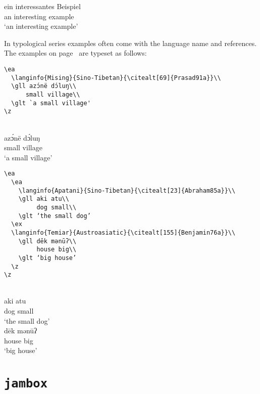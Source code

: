 \ea
\def\exfont{\normalsize\itshape}
\gll ein {\ob}interessantes       Beispiel{\cb}\\
     an  {\db}interesting example\\
\glt `an interesting example'
\z 
 


In typological series examples often come with the language name and references. The examples on
page~\pageref{ex-typology} are typeset as follows:
\begin{verbatim}
\ea
  \langinfo{Mising}{Sino-Tibetan}{\citealt[69]{Prasad91a}}\\
  \gll azɔ́në dɔ́luŋ\\
      small village\\ 
  \glt `a small village' 
\z
\end{verbatim}
\ea
  \\
  \gll azɔ́në dɔ́luŋ\\
      small village\\ 
  \glt `a small village' 
\z

\newpage

\begin{verbatim}
\ea 
  \ea
    \langinfo{Apatani}{Sino-Tibetan}{\citealt[23]{Abraham85a}}\\
    \gll aki atu\\ 
         dog small\\ 
    \glt ‘the small dog’ 
  \ex
  \langinfo{Temiar}{Austroasiatic}{\citealt[155]{Benjamin76a}}\\ 
    \gll dēk mənūʔ\\
         house big\\
    \glt ‘big house’ 
  \z
\z
\end{verbatim}

\ea 
  \ea
    \\
    \gll aki atu\\ 
	dog small\\ 
    \glt ‘the small dog’ 
  \ex
  \\ 
    \gll dēk mənūʔ\\
	house big\\
    \glt ‘big house’ 
  \z
\z

\def\exfont{\normalsize\upshape}

\section{\texttt{jambox}}
\label{sec-jambox}


